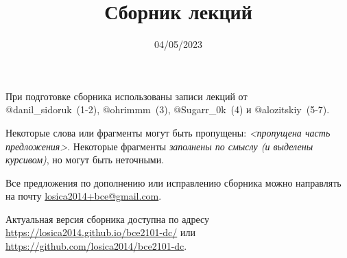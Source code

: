 

\title{Сборник лекций}
\date{04/05/2023}
\author{}
\email{}

\def \missed{\textit{<пропущена часть предложения>}}

\usepackage{multienum}
\newtheorem{definition}{Определение}



\maketitle

При подготовке сборника использованы записи лекций от\\@danil\_sidoruk~(1-2), @ohrimmm~(3), @Sugarr\_0k~(4) и @alozitskiy~(5-7).

Некоторые слова или фрагменты могут быть пропущены: \missed{}.
Некоторые фрагменты \textit{заполнены по смыслу (и выделены курсивом)}, но могут быть неточными.

Все предложения по дополнению или исправлению сборника можно направлять на почту \href{mailto:losica2014+bce@gmail.com?subject=%D0%94%D0%BE%D0%BF%D0%BE%D0%BB%D0%BD%D0%B5%D0%BD%D0%B8%D0%B5%20%D0%BA%20%D1%81%D0%B1%D0%BE%D1%80%D0%BD%D0%B8%D0%BA%D1%83%20%D0%BB%D0%B5%D0%BA%D1%86%D0%B8%D0%B9%20(%D0%AD%D0%94%D0%9E)&body=%D0%9E%D0%BF%D0%B8%D1%88%D0%B8%D1%82%D0%B5%20%D0%B7%D0%B4%D0%B5%D1%81%D1%8C%2C%20%D1%87%D1%82%D0%BE%20%D0%B2%D1%8B%20%D1%85%D0%BE%D1%82%D0%B8%D1%82%D0%B5%20%D0%B4%D0%BE%D0%BF%D0%BE%D0%BB%D0%BD%D0%B8%D1%82%D1%8C%20%D0%B8%D0%BB%D0%B8%20%D0%B8%D1%81%D0%BF%D1%80%D0%B0%D0%B2%D0%B8%D1%82%D1%8C.%20%D0%A3%D0%BA%D0%B0%D0%B6%D0%B8%D1%82%D0%B5%20%D1%82%D0%B5%D0%BC%D1%83%2C%20%D0%BC%D0%B5%D1%81%D1%82%D0%BE%20(%D0%BD%D0%BE%D0%BC%D0%B5%D1%80%20%D1%80%D0%B0%D0%B7%D0%B4%D0%B5%D0%BB%D0%B0)%20%D0%B8%20%D0%B2%D0%B0%D1%88%D0%B5%20%D0%B8%D1%81%D0%BF%D1%80%D0%B0%D0%B2%D0%BB%D0%B5%D0%BD%D0%B8%D0%B5.%20%D0%9F%D0%BE%20%D0%B2%D0%BE%D0%B7%D0%BC%D0%BE%D0%B6%D0%BD%D0%BE%D1%81%D1%82%D0%B8%20%D0%BF%D1%80%D0%BE%D0%BA%D0%BE%D0%BC%D0%BC%D0%B5%D0%BD%D1%82%D0%B8%D1%80%D1%83%D0%B9%D1%82%D0%B5%2C%20%D0%BF%D0%BE%D1%87%D0%B5%D0%BC%D1%83%20%D0%B2%D1%8B%20%D1%85%D0%BE%D1%82%D0%B8%D1%82%D0%B5%20%D1%82%D0%B0%D0%BA%20%D1%81%D0%B4%D0%B5%D0%BB%D0%B0%D1%82%D1%8C.}{losica2014+bce@gmail.com}.

Актуальная версия сборника доступна по адресу \url{https://losica2014.github.io/bce2101-dc/} или \url{https://github.com/losica2014/bce2101-dc}.


